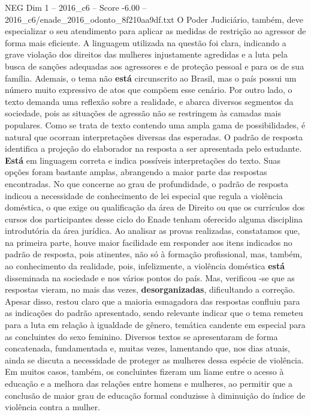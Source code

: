 \begin{textsample}{NEG Dim 1 – 2016\_c6 – Score -6.00 – 2016\_c6/enade\_2016\_odonto\_8f210aa9df.txt}
O Poder Judiciário, também, deve especializar o seu atendimento para aplicar as medidas de restrição ao agressor de forma mais eficiente.
A linguagem utilizada na questão foi clara, indicando a grave violação dos direitos das mulheres injustamente agredidas e a luta pela busca de sanções adequadas aos agressores e de proteção pessoal e para os de sua família.
Ademais, o tema não \textbf{está} circunscrito ao Brasil, mas o país possui um número muito expressivo de atos que compõem esse cenário.
Por outro lado, o texto demanda uma reflexão sobre a realidade, e abarca diversos segmentos da sociedade, pois as situações de agressão não se restringem às camadas mais populares.
Como se trata de texto contendo uma ampla gama de possibilidades, é natural que ocorram interpretações diversas das esperadas.
O padrão de resposta identifica a projeção do elaborador na resposta a ser apresentada pelo estudante. \textbf{Está} em linguagem correta e indica possíveis interpretações do texto.
Suas opções foram bastante amplas, abrangendo a maior parte das respostas encontradas.
No que concerne ao grau de profundidade, o padrão de resposta indicou a necessidade de conhecimento de lei especial que regula a violência doméstica, o que exige ou qualificação da área de Direito ou que os currículos dos cursos dos participantes desse ciclo do Enade tenham oferecido alguma disciplina introdutória da área jurídica.
Ao analisar as provas realizadas, constatamos que, na primeira parte, houve maior facilidade em responder aos itens indicados no padrão de resposta, pois atinentes, não só à formação profissional, mas, também, ao conhecimento da realidade, pois, infelizmente, a violência doméstica \textbf{está} disseminada na sociedade e nos vários pontos do país.
Mas, verificou -se que as respostas vieram, no mais das vezes, \textbf{desorganizadas}, dificultando a correção.
Apesar disso, restou claro que a maioria esmagadora das respostas confluiu para as indicações do padrão apresentado, sendo relevante indicar que o tema remeteu para a luta em relação à igualdade de gênero, temática candente em especial para as concluintes do sexo feminino.
Diversos textos se apresentaram de forma concatenada, fundamentada e, muitas vezes, lamentando que, nos dias atuais, ainda se discuta a necessidade de proteger as mulheres dessa espécie de violência.
Em muitos casos, também, os concluintes fizeram um liame entre o acesso à educação e a melhora das relações entre homens e mulheres, ao permitir que a conclusão de maior grau de educação formal conduzisse à diminuição do índice de violência contra a mulher.

\end{textsample}
